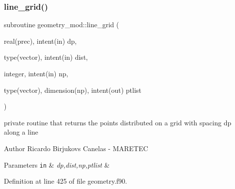 \subsubsection{\texorpdfstring{line\+\_\+grid()}{line\_grid()}}
{\footnotesize\ttfamily subroutine geometry\+\_\+mod\+::line\+\_\+grid (\begin{DoxyParamCaption}\item[{real(prec), intent(in)}]{dp,  }\item[{type(vector), intent(in)}]{dist,  }\item[{integer, intent(in)}]{np,  }\item[{type(vector), dimension(np), intent(out)}]{ptlist }\end{DoxyParamCaption})\hspace{0.3cm}{\ttfamily [private]}}



private routine that returns the points distributed on a grid with spacing dp along a line 

\begin{DoxyAuthor}{Author}
Ricardo Birjukovs Canelas -\/ M\+A\+R\+E\+T\+EC 
\end{DoxyAuthor}

\begin{DoxyParams}[1]{Parameters}
\mbox{\tt in}  & {\em dp,dist,np,ptlist} & \\
\hline
\end{DoxyParams}


Definition at line 425 of file geometry.\+f90.


